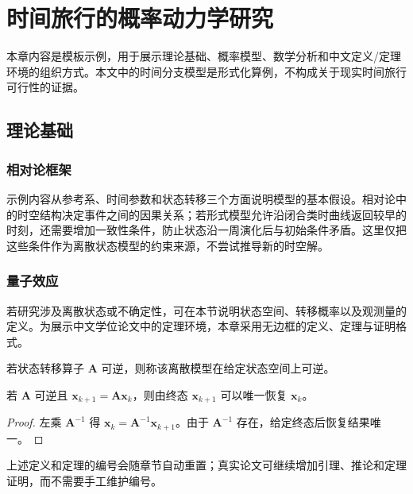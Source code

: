 \chapter{时间旅行的概率动力学研究}

本章内容是模板示例，用于展示理论基础、概率模型、数学分析和中文定义/定理环境的组织方式。本文中的时间分支模型是形式化算例，不构成关于现实时间旅行可行性的证据。

\section{理论基础}

\subsection{相对论框架}

示例内容从参考系、时间参数和状态转移三个方面说明模型的基本假设。相对论中的时空结构决定事件之间的因果关系；若形式模型允许沿闭合类时曲线返回较早的时刻，还需要增加一致性条件，防止状态沿一周演化后与初始条件矛盾。这里仅把这些条件作为离散状态模型的约束来源，不尝试推导新的时空解。

\subsection{量子效应}

若研究涉及离散状态或不确定性，可在本节说明状态空间、转移概率以及观测量的定义。为展示中文学位论文中的定理环境，本章采用无边框的定义、定理与证明格式。

\begin{defn}[可逆状态转移]
若状态转移算子 $\bm{A}$ 可逆，则称该离散模型在给定状态空间上可逆。
\end{defn}

\begin{thm}[状态转移的可逆性]
若 $\bm{A}$ 可逆且 $\bm{x}_{k+1}=\bm{A}\bm{x}_k$，则由终态 $\bm{x}_{k+1}$ 可以唯一恢复 $\bm{x}_k$。
\end{thm}

\begin{proof}
左乘 $\bm{A}^{-1}$ 得 $\bm{x}_k=\bm{A}^{-1}\bm{x}_{k+1}$。由于 $\bm{A}^{-1}$ 存在，给定终态后恢复结果唯一。
\end{proof}

上述定义和定理的编号会随章节自动重置；真实论文可继续增加引理、推论和定理证明，而不需要手工维护编号。


